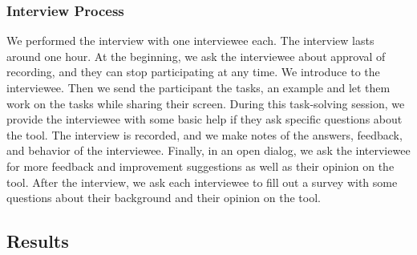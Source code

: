 \subsubsection{Interview Process}
We performed the interview with one interviewee each.
The interview lasts around one hour.
At the beginning, we ask the interviewee about approval of recording, and they can stop participating at any time.
We introduce \toolname{} to the interviewee.
Then we send the participant the tasks, an example \cfgfile{} and let them work on the tasks while sharing their screen.
During this task-solving session, we provide the interviewee with some basic help if they ask specific questions about the tool.
The interview is recorded, and we make notes of the answers, feedback, and behavior of the interviewee.
Finally, in an open dialog, we ask the interviewee for more feedback and improvement suggestions as well as their opinion on the tool.
After the interview, we ask each interviewee to fill out a survey with some questions about their background and their opinion on the tool.

\subsection{Results}\label{subsec:results}

